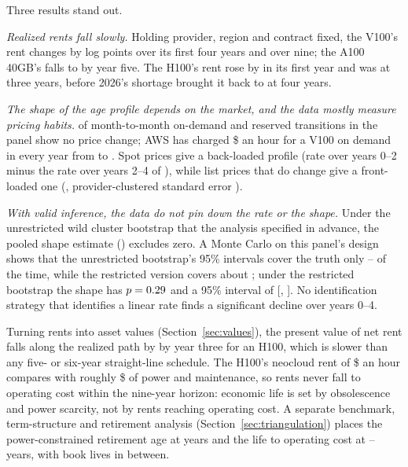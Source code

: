 Three results stand out.

\emph{Realized rents fall slowly.} Holding provider, region and contract fixed, the V100's rent
changes by \nPathVHundredFour{} log points over its first four years and \nPathVHundredNine{}
over nine; the A100 40GB's falls to \nPathAHundredFive{} by year five. The H100's rent rose by
\nPathHHundredOne{} in its first year and was \nPathHHundredThree{} at three years, before 2026's
shortage brought it back to \nPathHHundredFour{} at four years.

\emph{The shape of the age profile depends on the market, and the data mostly measure pricing
habits.} \nListUnchanged{} of month-to-month on-demand and reserved transitions in the panel show
no price change; AWS has charged \$\nAwsVHundredPrice{} an hour for a V100 on demand in every year
from \nAwsVHundredFirstYear{} to \nAwsVHundredLastYear{}. Spot prices give a back-loaded profile
(rate over years 0--2 minus the rate over years 2--4 of \nFourShapeSpot), while list prices that
do change give a front-loaded one (\nShapeListMovers, provider-clustered standard error
\nShapeListMoversSe). 

\emph{With valid inference, the data do not pin down the rate or the shape.} Under the
unrestricted wild cluster bootstrap that the analysis specified in advance, the pooled shape
estimate
(\nFourShape) excludes zero. A Monte Carlo on this panel's design shows that the unrestricted
bootstrap's 95\% intervals cover the truth only \nCovWcuLo--\nCovWcuHi{} of the time, while the
restricted version covers about \nCovWcrHi; under the restricted bootstrap the shape has
$p = 0.29$ and a 95\% interval of [\nFourShapeWcrLo, \nFourShapeWcrHi]. No
identification strategy that identifies a linear rate finds a significant decline over years 0--4.

Turning rents into asset values (Section~\ref{sec:values}), the present value of net rent falls
along the realized path by \nValRealLostThree{} by year three for an H100, which is slower than any
five- or six-year straight-line schedule. The H100's neocloud rent of \$\nValRentNow{} an hour
compares with roughly \$\nValOpex{} of power and maintenance, so rents never fall to operating cost within the
nine-year horizon: economic life is set by obsolescence and power scarcity, not by rents reaching
operating cost. A separate benchmark, term-structure and retirement analysis
(Section~\ref{sec:triangulation}) places the power-constrained retirement age at
\nPThreeMedian{} years and the life to operating cost at \nPTwoLopexLo--\nPTwoLopexHi{} years,
with book lives in between.

